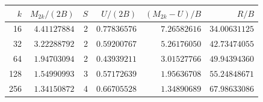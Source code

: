 \begin{tabular}{@{}rrrrrr@{}}
\toprule
$k$ & $M_{2k}/(2B)$ & $S$ & $U/(2B)$ & $(M_{2k}-U)/B$ & $R/B$ \\
\midrule
16 & $4.41127884$ & 2 & $0.77836576$ & $7.26582616$ & $34.00631125$ \\
32 & $3.22288792$ & 2 & $0.59200767$ & $5.26176050$ & $42.73474055$ \\
64 & $1.94703094$ & 2 & $0.43939211$ & $3.01527766$ & $49.94394360$ \\
128 & $1.54990993$ & 3 & $0.57172639$ & $1.95636708$ & $55.24848671$ \\
256 & $1.34150872$ & 4 & $0.66705528$ & $1.34890689$ & $67.98633086$ \\
\bottomrule
\end{tabular}
